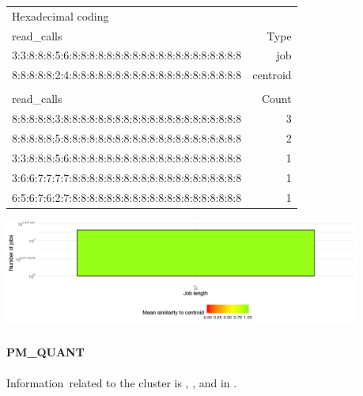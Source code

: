 \documentclass[]{llncs}
\begin{document}
\begingroup
  \centering
  \begin{tiny}
    \begin{tabular}{@{ }l@{ }|@{ }r@{ }}
      \rowcolor{tabhcolor}
      Hexadecimal coding & \\
      \rowcolor{tabhcolor}
      read\_calls                                           & Type     \\
      \hline
      3:3:8:8:8:5:6:8:8:8:8:8:8:8:8:8:8:8:8:8:8:8:8:8:8:8:8 & job      \\
      8:8:8:8:8:2:4:8:8:8:8:8:8:8:8:8:8:8:8:8:8:8:8:8:8:8:8 & centroid \\
      \multicolumn{2}{l}{}\\
			\rowcolor{tabhcolor}
      read\_calls                                           & Count    \\
      \hline
      8:8:8:8:8:3:8:8:8:8:8:8:8:8:8:8:8:8:8:8:8:8:8:8:8:8:8 & 3        \\
      8:8:8:8:8:5:8:8:8:8:8:8:8:8:8:8:8:8:8:8:8:8:8:8:8:8:8 & 2        \\
      3:3:8:8:8:5:6:8:8:8:8:8:8:8:8:8:8:8:8:8:8:8:8:8:8:8:8 & 1        \\
      3:6:6:7:7:7:7:8:8:8:8:8:8:8:8:8:8:8:8:8:8:8:8:8:8:8:8 & 1        \\
      6:5:6:7:6:2:7:8:8:8:8:8:8:8:8:8:8:8:8:8:8:8:8:8:8:8:8 & 1        \\
    \end{tabular}
  \end{tiny}
  \label{tab:use_case:hex_native:job_centroid}
\endgroup

\begingroup
  \centering
  \includegraphics[width=4.61in,height=1.39in]{./media/image2.png}
  \label{fig:use_case:hex_native:length}
\endgroup

\paragraph{PM\_QUANT}
Information\ related to the cluster is , , and in .
\end{document}
